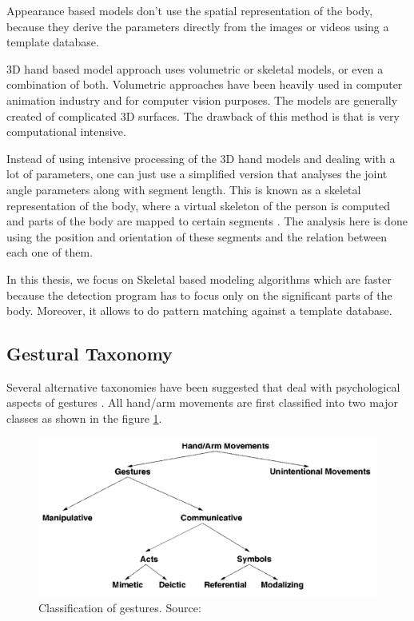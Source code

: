 Appearance based models don't use the spatial representation of the body, because they derive the parameters directly from the images or videos using a template database. 

3D hand based model approach uses volumetric or skeletal models, or even a combination of  both. Volumetric approaches have been heavily used in computer animation industry and for computer vision purposes. The models are generally created of complicated 3D surfaces. The drawback of this method is that is very computational intensive. 

Instead of using intensive processing of the 3D hand models and dealing with a lot of parameters, one can just use a simplified version that analyses the joint angle parameters along with segment length. This is known as a skeletal representation of the body, where a virtual skeleton of the person is computed and parts of the body are mapped to certain segments \cite{4}. The analysis here is done using the position and orientation of these segments and the relation between each one of them.

In this thesis, we focus on Skeletal based modeling algorithms which are faster because the detection program has to focus only on the significant parts of the body. Moreover, it allows to do pattern matching against a template database. 

\subsection{Gestural Taxonomy }
Several alternative taxonomies have been suggested that deal with psychological aspects of gestures \cite{3}. All hand/arm movements are first classified into two major classes as shown in the figure \ref{fig:ges:tax}.

\begin{figure}
	[h] \centering 
	\includegraphics[width=12cm]{figures/ges-tax.png} 
	\caption{Classification of gestures. Source: \cite{3}}
	\label{fig:ges:tax} 
\end{figure}

